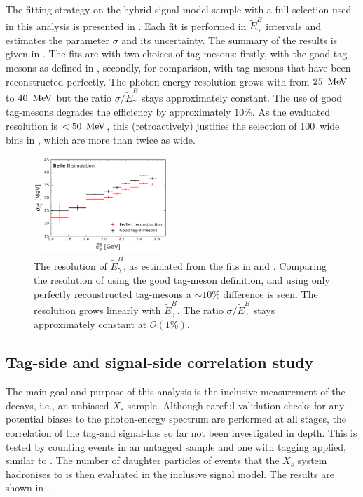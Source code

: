 The fitting strategy on the hybrid signal-model sample with a full selection used in this analysis is presented in .
Each fit is performed in $\tilde{E}_{\gamma}^{B}$ intervals and estimates the parameter $\sigma$ and its uncertainty.
The summary of the results is given in .
The fits are with two choices of tag-\B mesons: firstly, with the good tag-\B mesons as defined in ,
secondly, for comparison, with tag-\B mesons that have been reconstructed perfectly.
The photon energy resolution grows with \EB from $25~\mathrm{\,Me\kern -0.1em V}$ to $40~\mathrm{\,Me\kern -0.1em V}$
but the ratio $\sigma/\tilde{E}_{\gamma}^{B}$ stays approximately constant.
The use of good tag-\B mesons degrades the efficiency by approximately $10\%$.
As the evaluated resolution is $<50~\mathrm{\,Me\kern -0.1em V}$, this (retroactively) justifies the selection of 100~\mev wide bins in , which are more than twice as wide.

\begin{figure}[htbp!]
    \centering
    \includegraphics[width=0.45\textwidth]{figures/signal_validation/resolution_bin_by_bin_withkstar.pdf}
    \caption{\label{fig:resolution_sigmas} The resolution of $\tilde{E}_{\gamma}^{B}$, 
    as estimated from the fits in  and .
    Comparing the resolution of \EB using the good tag-\B meson definition, and using only perfectly reconstructed tag-\B mesons a $\sim 10\%$ difference is seen.
    The resolution grows linearly with $\tilde{E}_{\gamma}^{B}$.
    The ratio $\sigma/\tilde{E}_{\gamma}^{B}$ stays approximately constant at $\mathcal{O}(1\%)$.
    }
\end{figure}

\subsection{Tag-side and signal-side correlation study}\label{sec:inclusivity_study}

The main goal and purpose of this analysis is the inclusive measurement of the \BtoXsgamma decays, i.e.,
an unbiased $X_s$ sample.
Although careful validation checks for any potential biases to the photon-energy spectrum are performed at all stages,
the correlation of the tag-\B and signal-\B has so far not been investigated in depth.
This is tested by counting \BtoXsgamma events in an untagged sample and one with \FEI tagging applied, similar to .
The number of daughter particles of events that the $X_s$ system hadronises to is then evaluated in the inclusive \BtoXsgamma signal model.
The results are shown in .

